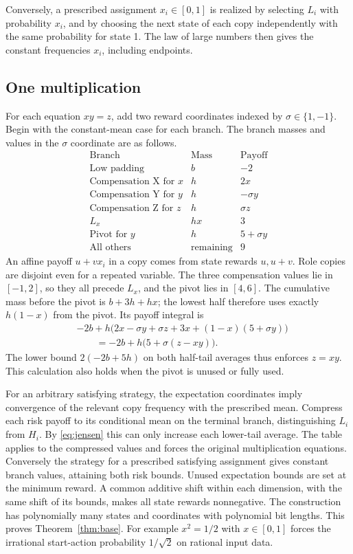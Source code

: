 \documentclass[11pt,a4paper]{amsart}
\begin{document}
Conversely, a prescribed assignment \(x_i\in[0,1]\) is realized by selecting \(L_i\) with probability \(x_i\), and by choosing the next state of each copy independently with the same probability for state 1. The law of large numbers then gives the constant frequencies \(x_i\), including endpoints.

\subsection{One multiplication}
For each equation \(xy=z\), add two reward coordinates indexed by \(\sigma\in\{1,-1\}\). Begin with the constant-mean case for each branch. The branch masses and values in the \(\sigma\) coordinate are as follows.
\[
\begin{array}{lcc}
 \text{Branch} & \text{Mass} & \text{Payoff} \\
 \text{Low padding} & b & -2 \\
 \text{Compensation X for }x & h & 2x \\
 \text{Compensation Y for }y & h & -\sigma y \\
 \text{Compensation Z for }z & h & \sigma z \\
 L_x & hx & 3 \\
 \text{Pivot for }y & h & 5+\sigma y \\
 \text{All others} & \text{remaining} & 9
\end{array}
\]
An affine payoff \(u+v x_i\) in a copy comes from state rewards \(u,u+v\). Role copies are disjoint even for a repeated variable. The three compensation values lie in \([-1,2]\), so they all precede \(L_x\), and the pivot lies in \([4,6]\). The cumulative mass before the pivot is \(b+3h+hx\); the lowest half therefore uses exactly \(h(1-x)\) from the pivot. Its payoff integral is
\begin{align*}
 &-2b+h\bigl(2x-\sigma y+\sigma z+3x+(1-x)(5+\sigma y)\bigr)\\
 &\hspace{2em}=-2b+h\bigl(5+\sigma(z-xy)\bigr).
\end{align*}
The lower bound \(2(-2b+5h)\) on both half-tail averages thus enforces \(z=xy\). This calculation also holds when the pivot is unused or fully used.

For an arbitrary satisfying strategy, the expectation coordinates imply convergence of the relevant copy frequency with the prescribed mean. Compress each risk payoff to its conditional mean on the terminal branch, distinguishing \(L_i\) from \(H_i\). By \eqref{eq:jensen} this can only increase each lower-tail average. The table applies to the compressed values and forces the original multiplication equations. Conversely the strategy for a prescribed satisfying assignment gives constant branch values, attaining both risk bounds. Unused expectation bounds are set at the minimum reward. A common additive shift within each dimension, with the same shift of its bounds, makes all state rewards nonnegative. The construction has polynomially many states and coordinates with polynomial bit lengths. This proves Theorem~\ref{thm:base}. For example \(x^2=1/2\) with \(x\in[0,1]\) forces the irrational start-action probability \(1/\sqrt2\) on rational input data.
\end{document}
